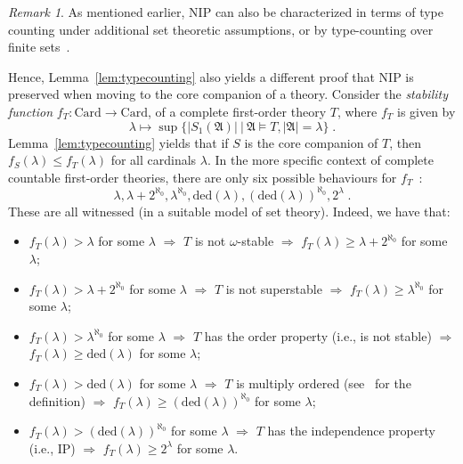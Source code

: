 \documentclass{amsart}
\theoremstyle{definition}
\theoremstyle{remark}
\newtheorem{remark}[theorem]{Remark}
\numberwithin{equation}{section}
\newcommand{\fa}{\mathfrak{A}}
\begin{document}
\begin{remark} As mentioned earlier, $\mathrm{NIP}$ can also be characterized in terms of type counting under additional set theoretic assumptions, or by type-counting over finite sets~\cite{shelah1971stability}.

Hence, Lemma~\ref{lem:typecounting} also yields a different proof that $\mathrm{NIP}$ is preserved when moving to the core companion  of a theory. Consider the \textit{stability function} $f_T \colon \mathrm{Card}\to\mathrm{Card}$, of a complete first-order theory $T$, where $f_T$ is given by
    \[\lambda\mapsto\sup\{|S_1(\fa)|\ \vert \ \fa\models T, |\fa|= \lambda\}\;.\]
Lemma~\ref{lem:typecounting} yields that if $S$ is the core companion  of $T$, then $f_S(\lambda)\leq f_T(\lambda)$ for all cardinals $\lambda$. In the more specific context of complete countable first-order theories, there are only six possible behaviours for $f_T$~\cite{keisler1976six}:
\[\lambda, \lambda+2^{\aleph_0}, \lambda^{\aleph_0}, \mathrm{ded}(\lambda), (\mathrm{ded}(\lambda))^{\aleph_0}, 2^\lambda\;.\]
These are all witnessed (in a suitable model of set theory). Indeed, we have that:
\begin{itemize}
    \item $f_T(\lambda)>\lambda$ for some $\lambda$ $\Rightarrow$ $T$ is not $\omega$-stable $\Rightarrow$  $f_T(\lambda)\geq\lambda+2^{\aleph_0}$ for some $\lambda$;
    \item $f_T(\lambda)>\lambda+2^{\aleph_0}$ for some $\lambda$ $\Rightarrow$ $T$ is not superstable $\Rightarrow$  $f_T(\lambda)\geq\lambda^{\aleph_0}$ for some $\lambda$;
    \item $f_T(\lambda)>\lambda^{\aleph_0}$ for some $\lambda$ $\Rightarrow$ $T$ has the order property (i.e., is not stable) $\Rightarrow$  $f_T(\lambda)\geq\mathrm{ded}(\lambda)$ for some $\lambda$;
    \item $f_T(\lambda)>\mathrm{ded}(\lambda)$ for some $\lambda$ $\Rightarrow$ $T$ is multiply ordered (see~\cite[Theorem 4]{keisler1976six} for the definition) $\Rightarrow$  $f_T(\lambda)\geq(\mathrm{ded}(\lambda))^{\aleph_0}$ for some $\lambda$;
    \item $f_T(\lambda)>(\mathrm{ded}(\lambda))^{\aleph_0}$ for some $\lambda$ $\Rightarrow$ $T$ has the independence property (i.e., $\mathrm{IP}$) $\Rightarrow$  $f_T(\lambda)\geq 2^\lambda$ for some $\lambda$.

\end{itemize}
\end{remark}
\end{document}
